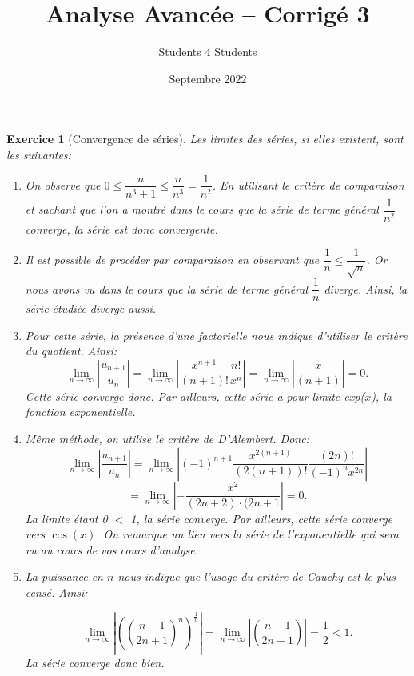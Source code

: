 \documentclass{article}
\title{\textbf{Analyse Avancée -- Corrigé 3}}
\author{Students 4 Students}
\date{Septembre 2022}
\theoremstyle{exercice}
\newtheorem{exercice}{Exercice}
\begin{document}
\pagestyle{fancy}

\maketitle



\begin{exercice}[Convergence de séries]
Les limites des séries, si elles existent, sont les suivantes:
\begin{enumerate}
    \item On observe que $0\leq\dfrac{n}{n^3+1}\leq \dfrac{n}{n^3}=\dfrac{1}{n^2} $. En utilisant le critère de comparaison et sachant que l'on a montré dans le cours que la série de terme général $\dfrac{1}{n^2}$ converge, la série est donc convergente.
    \item Il est possible de procéder par comparaison en observant que $\dfrac{1}{n}\leq \dfrac{1}{\sqrt{n}}$. Or nous avons vu dans le cours que la série de terme général $\dfrac{1}{n}$ diverge. Ainsi, la série étudiée diverge aussi.
    \item Pour cette série, la présence d'une factorielle nous indique d'utiliser le critère du quotient. Ainsi:
    \begin{equation}
        \lim_{n\to \infty}\left| \dfrac{u_{n+1}}{u_n}\right| =\lim_{n\to \infty} \left|  \dfrac{x^{n+1}}{(n+1)!}  \dfrac{n!}{x^n}  \right |=\lim_{n\to \infty} \left|  \dfrac{x}{(n+1)} \right |=0.
    \end{equation}
    Cette série converge donc. Par ailleurs, cette série a pour limite exp($x$), la fonction exponentielle.
    
    \item Même méthode, on utilise le critère de D'Alembert. Donc: 
    \begin{equation}
        \lim_{n\to \infty}\left| \dfrac{u_{n+1}}{u_n}\right| =\lim_{n\to \infty} \left|(-1)^{n+1} \dfrac{x^{2(n+1)}}{(2(n+1))!}\dfrac{(2n)!}{(-1)^{n} x^{2n}}\right|
    \end{equation}
    \begin{equation}
        =\lim_{n\to \infty}\left| - \dfrac{x^2}{(2n+2)\cdot (2n+1} \right|=0.
    \end{equation}
    La limite étant 0 $<$ 1, la série converge. Par ailleurs, cette série converge vers $\cos (x)$. On remarque un lien vers la série de l'exponentielle qui sera vu au cours de vos cours d'analyse. 
    \item La puissance en $n$ nous indique que l'usage du critère de Cauchy est le plus censé. Ainsi:

    \begin{equation}
        \lim_{n\to \infty}\left| \left(  \left (\dfrac{n-1}{2n+1}\right )^n\right)^{\frac{1}{n}}  \right |= \lim_{n\to \infty}\left|   \left (\dfrac{n-1}{2n+1}\right )  \right |=\dfrac{1}{2}<1.
    \end{equation}
    La série converge donc bien.
\end{enumerate}
\end{exercice}
\end{document}
